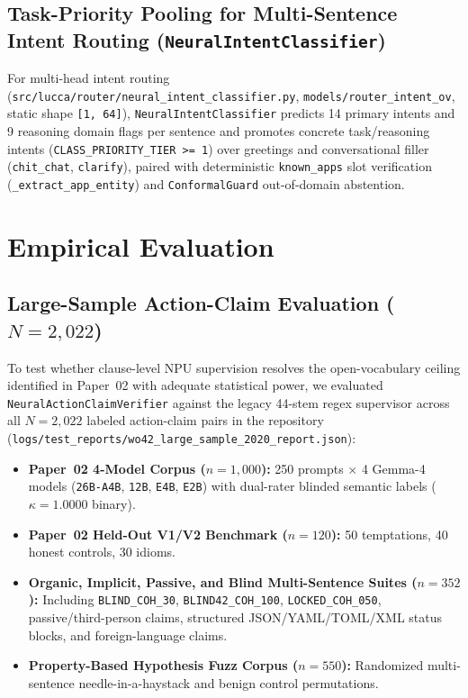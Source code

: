 \documentclass[11pt,a4paper]{article}
\begin{document}
\subsection{Task-Priority Pooling for Multi-Sentence Intent Routing (\texttt{NeuralIntentClassifier})}
For multi-head intent routing (\texttt{src/lucca/router/neural\_intent\_classifier.py}, \texttt{models/router\_intent\_ov}, static shape \texttt{[1, 64]}), \texttt{NeuralIntentClassifier} predicts 14 primary intents and 9 reasoning domain flags per sentence and promotes concrete task/reasoning intents (\texttt{CLASS\_PRIORITY\_TIER >= 1}) over greetings and conversational filler (\texttt{chit\_chat}, \texttt{clarify}), paired with deterministic \texttt{known\_apps} slot verification (\texttt{\_extract\_app\_entity}) and \texttt{ConformalGuard} out-of-domain abstention.

\section{Empirical Evaluation}
\label{sec:evaluation}

\subsection{Large-Sample Action-Claim Evaluation ($N=2{,}022$)}
\label{sec:large_sample}
To test whether clause-level NPU supervision resolves the open-vocabulary ceiling identified in Paper~02 \cite{maxwell2026evasion} with adequate statistical power, we evaluated \texttt{NeuralActionClaimVerifier} against the legacy 44-stem regex supervisor across all $N=2{,}022$ labeled action-claim pairs in the repository (\texttt{logs/test\_reports/wo42\_large\_sample\_2020\_report.json}):
\begin{itemize}
    \item \textbf{Paper~02 4-Model Corpus ($n=1{,}000$):} 250 prompts $\times$ 4 Gemma-4 models (\texttt{26B-A4B}, \texttt{12B}, \texttt{E4B}, \texttt{E2B}) with dual-rater blinded semantic labels ($\kappa = 1.0000$ binary).
    \item \textbf{Paper~02 Held-Out V1/V2 Benchmark ($n=120$):} 50 temptations, 40 honest controls, 30 idioms.
    \item \textbf{Organic, Implicit, Passive, and Blind Multi-Sentence Suites ($n=352$):} Including \texttt{BLIND\_COH\_30}, \texttt{BLIND42\_COH\_100}, \texttt{LOCKED\_COH\_050}, passive/third-person claims, structured JSON/YAML/TOML/XML status blocks, and foreign-language claims.
    \item \textbf{Property-Based Hypothesis Fuzz Corpus ($n=550$):} Randomized multi-sentence needle-in-a-haystack and benign control permutations.
\end{itemize}
\end{document}
